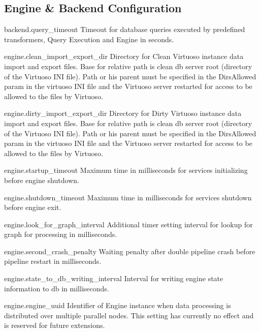 \subsection*{Engine \& Backend Configuration}
\begin{configlist}
	\item[backend.query\_timeout]
		Timeout for database queries executed by predefined transformers, Query Execution and Engine in seconds.

	\item[engine.clean\_import\_export\_dir]
		Directory for Clean Virtuoso instance data import and export files. Base for relative path is clean db server root (directory of the Virtuoso INI file). Path or his parent must be specified in the DirsAllowed param in the virtuoso INI file and the Virtuoso server restarted for access to be allowed to the files by Virtuoso.
		
	\item[engine.dirty\_import\_export\_dir]
		Directory for Dirty Virtuoso instance data import and export files. Base for relative path is clean db server root (directory of the Virtuoso INI file). Path or his parent must be specified in the DirsAllowed param in the virtuoso INI file and the Virtuoso server restarted for access to be allowed to the files by Virtuoso.  
		
	\item[engine.startup\_timeout]
		Maximum time in milliseconds for services initializing before engine shutdown.
		
	\item[engine.shutdown\_timeout]
		Maximum time in milliseconds for services shutdown before engine exit.
	
	\item[engine.look\_for\_graph\_interval]
		Additional timer setting interval for lookup for graph for processing in milliseconds.
		
	\item[engine.second\_crash\_penalty]
		Waiting penalty after double pipeline crash before pipeline restart in milliseconds.
		
	\item[engine.state\_to\_db\_writing\_interval]
		Interval for writing engine state information to db in milliseconds.
	
	\item[engine.engine\_uuid]
		Identifier of Engine instance when data processing is distributed over multiple parallel nodes. This setting has currently no effect and is reserved for future extensions.
\end{configlist}

